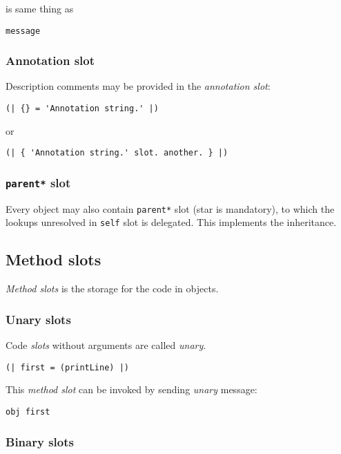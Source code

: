 \documentclass[10pt]{article}
\begin{document}
\begin{multicols*}{3}
is same thing as

\begin{lstlisting}
message
\end{lstlisting}


\subsubsection{Annotation slot}

Description comments may be provided in the \textit{annotation slot}:

\begin{lstlisting}
(| {} = 'Annotation string.' |)
\end{lstlisting}

or

\begin{lstlisting}
(| { 'Annotation string.' slot. another. } |)
\end{lstlisting}


\subsubsection{\texttt{parent*} slot}
Every object may also contain \texttt{parent*} slot (star is mandatory), to which the lookups unresolved in \texttt{self} slot is delegated. This implements the inheritance.




\subsection{Method slots}

\textit{Method slots} is the storage for the code in objects.

\subsubsection{Unary slots}
Code \textit{slots} without arguments are called \textit{unary}.

\begin{lstlisting}
(| first = (printLine) |)
\end{lstlisting}

This \textit{method slot} can be invoked by sending \textit{unary} message:

\begin{lstlisting}
obj first
\end{lstlisting}



\subsubsection{Binary slots}


\end{multicols*}
\end{document}
